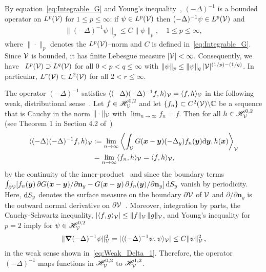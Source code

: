 \documentclass[amsa]{ipart}
\begin{document}
By equation~\eqref{eq:Integrable_G} and Young's
inequality~\cite{Folland:95:PDEs,Folland:99:RealAnalysis}, 
$(-\Delta)^{-1}$ is a bounded operator on $L^p(\mathcal{V})$ for $1\leq p\leq\infty$: if $\psi\in
L^p(\mathcal{V})$ then $(-\Delta)^{-1}\psi\in L^p(\mathcal{V})$ and   
%
\begin{align}\label{eq:Young_Ineq}
  \|(-\Delta)^{-1}\psi\|_p\leq C\|\psi\|_p,
  \quad
  1\leq p\leq\infty,
\end{align}
%
where $\|\cdot\|_p$ denotes the $L^p(\mathcal{V})$--norm and $C$ is defined
in~\eqref{eq:Integrable_G}. Since $\mathcal{V}$ is bounded, it has finite
Lebesgue measure $|\mathcal{V}|<\infty$. Consequently, we 
have~\cite{Folland:99:RealAnalysis} $L^p(\mathcal{V})\supset L^q(\mathcal{V})$ for all
$0<p<q\leq\infty$ with $\|\psi\|_p\leq\|\psi\|_q\,|\mathcal{V}|^{(1/p)-(1/q)}$. In particular,
$L^r(\mathcal{V})\subset L^2(\mathcal{V})$ for all $2<r\leq\infty$. 




The operator $(-\Delta)^{-1}$ satisfies $\langle(-\Delta)(-\Delta)^{-1}f,h\rangle_{\mathcal{V}}=\langle
f,h\rangle_{\mathcal{V}}$ in the following weak, distributional
sense~\cite{McOwen:2003:PDE,Folland:95:PDEs,Stakgold:BVP:2000}.
Let $f\in\mathscr{H}^{0,2}_{\mathcal{V}}$ and let $\{f_n\}\subset C^2(\mathcal{V})\backslash\mathbb{C}$ be a
sequence that is Cauchy in the norm $\|\cdot\|_{\mathcal{V}}$ with
$\lim_{n\to\infty}f_n=f$. Then for all $h\in\mathscr{H}^{0,2}_{\mathcal{V}}$ (see Theorem 1 in
Section 4.2 of~\cite{McOwen:2003:PDE})        
%
\begin{align}\label{eq:Weak_Delta_1}
  \langle(-\Delta)(-\Delta)^{-1}f,h\rangle_{\Vc}
  &:=\lim_{n\to\infty}
  \left\langle\int_{\Vc} G(\vecx-\vecy)(-\Delta_y)f_n(\vecy)\d\vecy,h(\vecx)\right\rangle_{\Vc}
  \\\notag
  &=\lim_{n\to\infty}\langle f_n,h\rangle_{\Vc}
  =\langle f,h\rangle_{\Vc},
  \notag
\end{align}
%
by the continuity of the
inner-product~\cite{Folland:99:RealAnalysis,Stakgold:BVP:2000} 
and since the boundary terms~\cite{McOwen:2003:PDE}
$\int_{\partial\mathcal{V}}[f_n(\boldsymbol{y})\,\partial G(\boldsymbol{x}-\boldsymbol{y})/\partial\mathbf{n}_y
-G(\boldsymbol{x}-\boldsymbol{y})\,\partial f_n(\boldsymbol{y})/\partial\mathbf{n}_y]\,\mathrm{d} S_y$ vanish by   
periodicity. Here, $\mathrm{d} S_y$ denotes the surface measure on the
boundary $\partial\mathcal{V}$ of $\mathcal{V}$ and $\partial/\partial\mathbf{n}_y$ is the outward normal
derivative on $\partial\mathcal{V}$~\cite{McOwen:2003:PDE}. Moreover, integration by
parts, the Cauchy-Schwartz inequality, $|\langle
f,g\rangle_{\mathcal{V}}|\leq\|f\|_{\mathcal{V}}\,\|g\|_{\mathcal{V}}$, and Young's inequality for $p=2$
imply for $\psi\in\mathscr{H}^{0,2}_{\mathcal{V}}$   
%
\begin{align}\label{eq:L2_to_H1}
  \|\bnabla(-\Delta)^{-1}\psi\|^2_{\Vc}
              =|\langle(-\Delta)^{-1}\psi,\psi\rangle_{\Vc}|
              \leq C\|\psi\|_{\Vc}^2\,,
\end{align}
%
in the weak sense shown in~\eqref{eq:Weak_Delta_1}.
Therefore, the operator $(-\Delta)^{-1}$ maps  functions in
$\mathscr{H}^{0,2}_{\mathcal{V}}$ to $\mathscr{H}^{1,2}_{\mathcal{V}}$.
\end{document}
